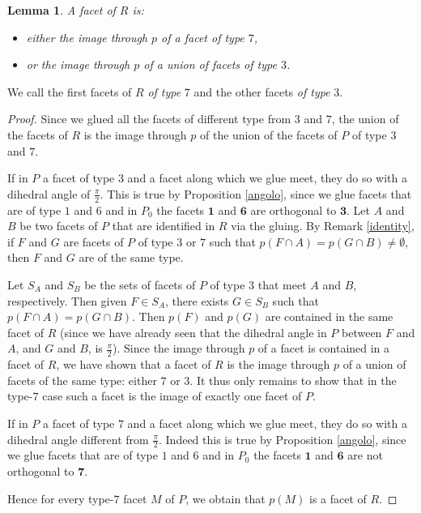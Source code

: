 \documentclass{amsart}
\newtheorem{lemma}{Lemma}[section]
\theoremstyle{definition}
\theoremstyle{remark}
\begin{document}
\begin{lemma}
\label{tipi}
    A facet of $R$ is:
    \begin{itemize}
        \item either the image through $p$ of a facet of type $7$,
        \item or the image through $p$ of a union of facets of type $3$.
    \end{itemize}
\end{lemma}
We call the first facets of $R$ \emph{of type} $7$ and the other facets \emph{of type} $3$.
\begin{proof}
    Since we glued all the facets of different type from $3$ and $7$, the union of the facets of $R$ is the image through $p$ of the union of the facets of $P$ of type $3$ and $7$.

    If in $P$ a facet of type $3$ and a facet along which we glue meet, they do so with a dihedral angle of $\frac{\pi}{2}$. This is true by Proposition \ref{angolo}, since we glue facets that are of type $1$ and $6$ and in $P_0$ the facets $\textbf{1}$ and $\textbf{6}$ are orthogonal to $\textbf{3}$.
    Let $A$ and $B$ be two facets of $P$ that are identified in $R$ via the gluing.
    By Remark \ref{identity}, if $F$ and $G$ are facets of $P$ of type $3$ or $7$ such that $p(F\cap A)=p(G\cap B)\ne \emptyset$, then $F$ and $G$ are of the same type.

    Let $S_A$ and $S_B$ be the sets of facets of $P$ of type $3$ that meet $A$ and $B$, respectively. Then given $F\in S_A$, there exists $G\in S_B$ such that $p(F\cap A)=p(G\cap B)$. Then $p(F)$ and $p(G)$ are contained in the same facet of $R$ (since we have already seen that the dihedral angle in $P$ between $F$ and $A$, and $G$ and $B$, is $\frac{\pi}{2}$).
    Since the image through $p$ of a facet is contained in a facet of $R$, we have shown that a facet of $R$ is the image through $p$ of a union  of facets of the same type: either $7$ or $3$. It thus only remains to show that in the type-$7$ case such a facet is the image of exactly one facet of $P$.


    If in $P$ a facet of type $7$ and a facet along which we glue meet, they do so with a dihedral angle different from $\frac{\pi}{2}$. Indeed this is true by Proposition \ref{angolo}, since we glue facets that are of type $1$ and $6$ and in $P_0$ the facets $\textbf{1}$ and $\textbf{6}$ are not orthogonal to $\textbf{7}$.

    Hence for every type-$7$ facet $M$ of $P$, we obtain that $p(M)$ is a facet of $R$.
\end{proof}
\end{document}
